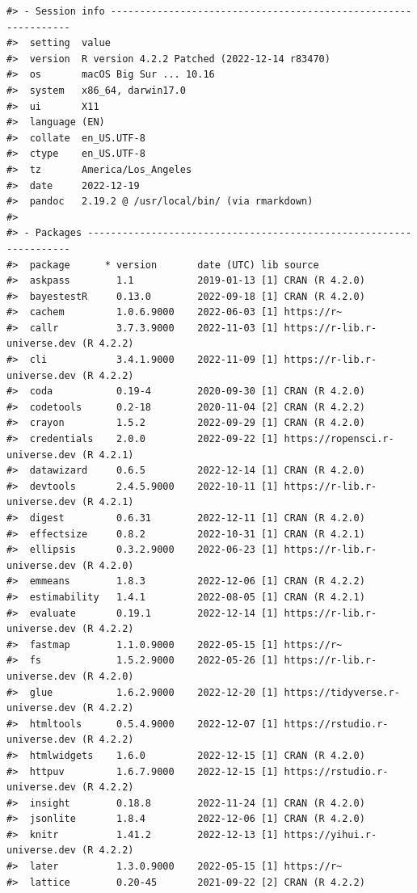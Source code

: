 \documentclass[
  number]{elsarticle}
\begin{document}
\begin{verbatim}
#> - Session info ---------------------------------------------------------------
#>  setting  value
#>  version  R version 4.2.2 Patched (2022-12-14 r83470)
#>  os       macOS Big Sur ... 10.16
#>  system   x86_64, darwin17.0
#>  ui       X11
#>  language (EN)
#>  collate  en_US.UTF-8
#>  ctype    en_US.UTF-8
#>  tz       America/Los_Angeles
#>  date     2022-12-19
#>  pandoc   2.19.2 @ /usr/local/bin/ (via rmarkdown)
#> 
#> - Packages -------------------------------------------------------------------
#>  package      * version       date (UTC) lib source
#>  askpass        1.1           2019-01-13 [1] CRAN (R 4.2.0)
#>  bayestestR     0.13.0        2022-09-18 [1] CRAN (R 4.2.0)
#>  cachem         1.0.6.9000    2022-06-03 [1] https://r~
#>  callr          3.7.3.9000    2022-11-03 [1] https://r-lib.r-universe.dev (R 4.2.2)
#>  cli            3.4.1.9000    2022-11-09 [1] https://r-lib.r-universe.dev (R 4.2.2)
#>  coda           0.19-4        2020-09-30 [1] CRAN (R 4.2.0)
#>  codetools      0.2-18        2020-11-04 [2] CRAN (R 4.2.2)
#>  crayon         1.5.2         2022-09-29 [1] CRAN (R 4.2.0)
#>  credentials    2.0.0         2022-09-22 [1] https://ropensci.r-universe.dev (R 4.2.1)
#>  datawizard     0.6.5         2022-12-14 [1] CRAN (R 4.2.0)
#>  devtools       2.4.5.9000    2022-10-11 [1] https://r-lib.r-universe.dev (R 4.2.1)
#>  digest         0.6.31        2022-12-11 [1] CRAN (R 4.2.0)
#>  effectsize     0.8.2         2022-10-31 [1] CRAN (R 4.2.1)
#>  ellipsis       0.3.2.9000    2022-06-23 [1] https://r-lib.r-universe.dev (R 4.2.0)
#>  emmeans        1.8.3         2022-12-06 [1] CRAN (R 4.2.2)
#>  estimability   1.4.1         2022-08-05 [1] CRAN (R 4.2.1)
#>  evaluate       0.19.1        2022-12-14 [1] https://r-lib.r-universe.dev (R 4.2.2)
#>  fastmap        1.1.0.9000    2022-05-15 [1] https://r~
#>  fs             1.5.2.9000    2022-05-26 [1] https://r-lib.r-universe.dev (R 4.2.0)
#>  glue           1.6.2.9000    2022-12-20 [1] https://tidyverse.r-universe.dev (R 4.2.2)
#>  htmltools      0.5.4.9000    2022-12-07 [1] https://rstudio.r-universe.dev (R 4.2.2)
#>  htmlwidgets    1.6.0         2022-12-15 [1] CRAN (R 4.2.0)
#>  httpuv         1.6.7.9000    2022-12-15 [1] https://rstudio.r-universe.dev (R 4.2.2)
#>  insight        0.18.8        2022-11-24 [1] CRAN (R 4.2.0)
#>  jsonlite       1.8.4         2022-12-06 [1] CRAN (R 4.2.0)
#>  knitr          1.41.2        2022-12-13 [1] https://yihui.r-universe.dev (R 4.2.2)
#>  later          1.3.0.9000    2022-05-15 [1] https://r~
#>  lattice        0.20-45       2021-09-22 [2] CRAN (R 4.2.2)

\end{verbatim}
\end{document}
